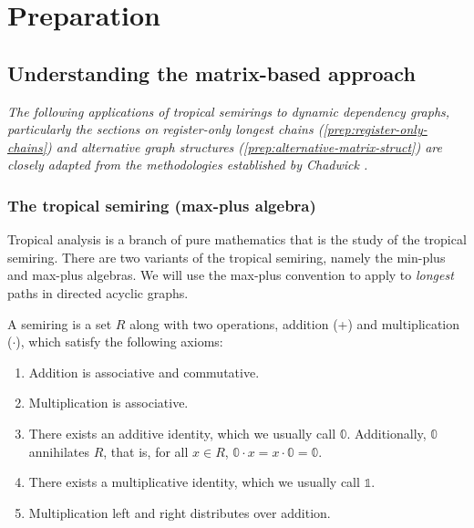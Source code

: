 \chapter{Preparation}

\section{Understanding the matrix-based approach}

\textit{The following applications of tropical semirings to dynamic dependency graphs, particularly the sections on 
register-only longest chains (\ref{prep:register-only-chains})
and alternative graph structures (\ref{prep:alternative-matrix-struct})
are closely adapted from the methodologies established by Chadwick \cite{Chadderz}.}

\subsection{The tropical semiring (max-plus algebra)}

Tropical analysis is a branch of pure mathematics that is the study of the tropical semiring.
There are two variants of the tropical semiring, namely the min-plus and max-plus algebras.
We will use the max-plus convention to apply to \textit{longest} paths in directed acyclic graphs.

 

\begin{definition}[Semiring] \label{def:semiring}
  A semiring \cite{Wandsnider2020} is a set $R$ along with two operations, addition (+) and multiplication ($\cdot$), which satisfy the 
  following axioms:

  \begin{enumerate}
    \item Addition is associative and commutative.
    \item Multiplication is associative.
    \item There exists an additive identity, which we usually call $\mathbb{0}$. Additionally, $\mathbb{0}$ annihilates 
      $R$, that is, for all $x \in R$, $\mathbb{0} \cdot x = x \cdot \mathbb{0} = \mathbb{0}$.
    \item There exists a multiplicative identity, which we usually call $\mathbb{1}$.
    \item Multiplication left and right distributes over addition.
  \end{enumerate}
\end{definition}

